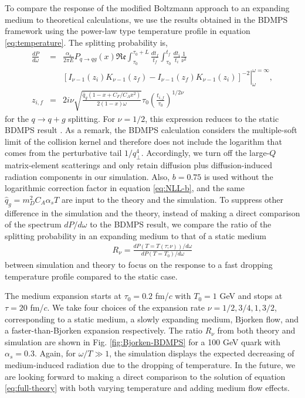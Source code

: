 \documentclass[aps, prc, reprint, amsmath, groupedaddress, nofootinbib]{revtex4-1}
\begin{document}
To compare the response of the modified Boltzmann approach to an expanding medium to theoretical calculations, we use the results obtained in the BDMPS framework \cite{Baier:1998yf} using the power-law type temperature profile in equation \ref{eq:temperature}. 
The splitting probability is,
\begin{eqnarray}
\frac{dP}{d\omega} &=& \frac{\alpha_s}{2\pi E}P_{q\rightarrow qg}(x)\mathfrak{Re}\int_{\tau_0}^{\tau_0+L}\frac{dt_f}{t_f}\int_{\tau_0}^{t_f}\frac{dt_i}{t_i} \frac{1}{\nu^2}\\
\nonumber
&& \left.\left[ I_{\nu-1}(z_i)K_{\nu-1}(z_f)-I_{\nu-1}(z_f)K_{\nu-1}(z_i)\right]^{-2}\right|_{\omega}^{\omega=\infty},\\
z_{i,f} &=& 2i\nu \sqrt{\frac{\hat{q}_g(1-x+C_F/C_A x^2)}{2(1-x)\omega}} \tau_0 \left( \frac{t_{i,f}}{\tau_0}\right) ^{1/2\nu}
\end{eqnarray}
for the $q\rightarrow q+g$ splitting.
For $\nu=1/2$, this expression reduces to the static BDMPS result \cite{Baier:1996kr}. 
As a remark, the BDMPS calculation considers the multiple-soft limit of the collision kernel and therefore does not include the logarithm that comes from the perturbative tail $1/q_\perp^4$. 
Accordingly, we turn off the large-$Q$ matrix-element scatterings and only retain diffusion plus diffusion-induced radiation components in our simulation.
Also, $b=0.75$ is used without the logarithmic correction factor in equation \ref{eq:NLL-b}, and the same $\hat{q}_g = m_D^2 C_A\alpha_s T$ are input to the theory and the simulation.
To suppress other difference in the simulation and the theory, instead of making a direct comparison of the spectrum $dP/d\omega$ to the BDMPS result, we compare the ratio of the splitting probability in an expanding medium to that of a static medium
\begin{eqnarray}
R_\nu = \frac{dP(T=T(\tau;\nu))/d\omega}{dP(T=T_0)/d\omega}
\end{eqnarray}
between simulation and theory to focus on the response to a fast dropping temperature profile compared to the static case.

The medium expansion starts at $\tau_0=0.2$ fm/$c$ with $T_0=1$ GeV and stops at $\tau = 20$ fm/$c$.
We take four choices of the expansion rate $\nu = 1/2, 3/4, 1, 3/2$, corresponding to a static medium, a slowly expanding medium, Bjorken flow, and a faster-than-Bjorken expansion respectively.
The ratio $R_\nu$ from both theory and simulation are shown in Fig. \ref{fig:Bjorken-BDMPS} for a 100 GeV quark with $\alpha_s=0.3$.
Again, for $\omega/T \gg 1$, the simulation displays the expected decreasing of medium-induced radiation due to the dropping of temperature.
In the future, we are looking forward to making a direct comparison to the solution of equation \ref{eq:full-theory} with both varying temperature and adding medium flow effects.
\end{document}
